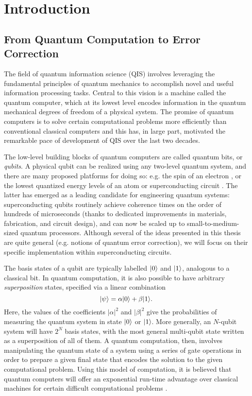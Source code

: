 \chapter{Introduction\label{ch:1_Introduction}}

\section{From Quantum Computation to Error Correction}

The field of quantum information science (QIS) involves leveraging the fundamental principles of quantum mechanics to accomplish novel and useful information processing tasks. Central to this vision is a machine called the quantum computer, which at its lowest level encodes information in the quantum mechanical degrees of freedom of a physical system. The promise of quantum computers is to solve certain computational problems more efficiently than conventional classical computers and this has, in large part, motivated the remarkable pace of development of QIS over the last two decades. 

The low-level building blocks of quantum computers are called quantum bits, or \textit{qubits}. A physical qubit can be realized using any two-level quantum system, and there are many proposed platforms for doing so: e.g. the spin of an electron \cite{burkard2023semiconductor}, or the lowest quantized energy levels of an atom \cite{briegel2000quantum} or superconducting circuit \cite{devoret2013superconducting, krantz2019quantum, kjaergaard2020superconducting}. The latter has emerged as a leading candidate for engineering quantum systems: superconducting qubits routinely achieve coherence times on the order of hundreds of microseconds \cite{kjaergaard2020superconducting} (thanks to dedicated improvements in materials, fabrication, and circuit design), and can now be scaled up to small-to-medium-sized quantum processors. Although several of the ideas presented in this thesis are quite general (e.g. notions of quantum error correction), we will focus on their specific implementation within superconducting circuits. 

The basis states of a qubit are typically labelled $\lvert0\rangle$ and $\lvert1\rangle$, analogous to a classical bit. In quantum computation, it is also possible to have arbitrary \textit{superposition} states, specified via a linear combination
\begin{equation}
    \lvert\psi\rangle = \alpha\lvert0\rangle + \beta\lvert1\rangle.
\end{equation}
Here, the values of the coefficients $|\alpha|^2$ and $|\beta|^2$ give the probabilities of measuring the quantum system in state $\lvert0\rangle$ or $\lvert1\rangle$. More generally, an $N$-qubit system will have $2^N$ basis states, with the most general multi-qubit state written as a superposition of all of them. A quantum computation, then, involves manipulating the quantum state of a system using a series of gate operations in order to prepare a given final state that encodes the solution to the given computational problem. Using this model of computation, it is believed that quantum computers will offer an exponential run-time advantage over classical machines for certain difficult computational problems \cite{manenti2023quantum, ike-and-mike}. 

